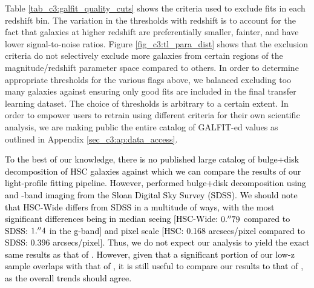 Table \ref{tab_c3:galfit_quality_cuts} shows the criteria used to exclude fits in each redshift bin. The variation in the thresholds with redshift is to account for the fact that galaxies at higher redshift are preferentially smaller, fainter, and have lower signal-to-noise ratios. Figure \ref{fig_c3:tl_para_dist} shows that the exclusion criteria do not selectively exclude more galaxies from certain regions of the magnitude/redshift parameter space compared to others. In order to determine appropriate thresholds for the various flags above, we balanced excluding too many galaxies against ensuring only good fits are included in the final transfer learning dataset. The choice of thresholds is arbitrary to a certain extent. In order to empower users to retrain \gampen{} using different criteria for their own scientific analysis, we are making public the entire catalog of GALFIT-ed values as outlined in Appendix \ref{sec_c3:ap:data_access}.


\textcolor{black}{To the best of our knowledge, there is no published large catalog of bulge+disk decomposition of HSC galaxies against which we can compare the results of our light-profile fitting pipeline. However, \citet{simard_11} performed bulge+disk decomposition using \gb{} and \rb{}-band imaging from the Sloan Digital Sky Survey (SDSS). We should note that HSC-Wide differs from SDSS in a multitude of ways, with the most significant differences being in median seeing [HSC-Wide: $0.\mbox{$^{\prime\prime}$}79$ compared to SDSS: $1.\mbox{$^{\prime\prime}$}4$ in the g-band] and pixel scale [HSC: 0.168 arcsecs/pixel compared to SDSS: 0.396 arcsecs/pixel]. Thus, we do not expect our analysis to yield the exact same results as that of \citet{simard_11}. However, given that a significant portion of our low-z sample overlaps with that of \citet{simard_11}, it is still useful to compare our results to that of \citet{simard_11}, as the overall trends should agree.}

